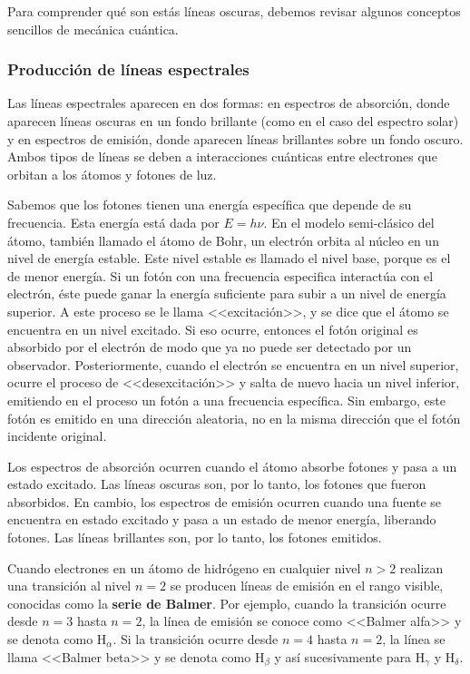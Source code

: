 Para comprender qué son estás líneas oscuras, debemos revisar algunos conceptos sencillos de mecánica cuántica.

\subsubsection{Producción de líneas espectrales}
Las líneas espectrales aparecen en dos formas: en espectros de absorción, donde aparecen líneas oscuras en un fondo brillante (como en el caso del espectro solar) y en espectros de emisión, donde aparecen líneas brillantes sobre un fondo oscuro. Ambos tipos de líneas se deben a interacciones cuánticas entre electrones que orbitan a los átomos y fotones de luz. 

Sabemos que los fotones tienen una energía específica que depende de su frecuencia. Esta energía está dada por $ E = h\nu $. En el modelo semi-clásico del átomo, también llamado el átomo de Bohr, un electrón orbita al núcleo en un nivel de energía estable. Este nivel estable es llamado el nivel base, porque es el de menor energía. Si un fotón con una frecuencia especifica interactúa con el electrón, éste puede ganar la energía suficiente para subir a un nivel de energía superior. A este proceso se le llama <<excitación>>, y se dice que el átomo se encuentra en un nivel excitado. Si eso ocurre, entonces el fotón original es absorbido por el electrón de modo que ya no puede ser detectado por un observador. Posteriormente, cuando el electrón se encuentra en un nivel superior, ocurre el proceso de <<desexcitación>> y salta de nuevo hacia un nivel inferior, emitiendo en el proceso un fotón a una frecuencia específica. Sin embargo, este fotón es emitido en una dirección aleatoria, no en la misma dirección que el fotón incidente original. 

Los espectros de absorción ocurren cuando el átomo absorbe fotones y pasa a un estado excitado. Las líneas oscuras son, por lo tanto, los fotones que fueron absorbidos. En cambio, los espectros de emisión ocurren cuando una fuente se encuentra en estado excitado y pasa a un estado de menor energía, liberando fotones. Las líneas brillantes son, por lo tanto, los fotones emitidos. 

Cuando electrones en un átomo de hidrógeno en cualquier nivel $ n > 2 $  realizan una transición al nivel $ n=2 $ se producen líneas de emisión en el rango visible, conocidas como la \textbf{serie de Balmer}. Por ejemplo, cuando la transición ocurre desde $ n=3 $ hasta $ n=2 $, la línea de emisión se conoce como <<Balmer alfa>> y se denota como $ \mathrm{H}_{\alpha} $. Si la transición ocurre desde $ n=4 $ hasta $ n=2 $, la línea se llama <<Balmer beta>> y se denota como $ \mathrm{H}_{\beta} $ y así sucesivamente para $ \mathrm{H}_{\gamma} $ y $ \mathrm{H}_{\delta} $.

